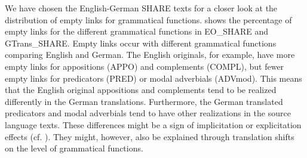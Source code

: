 \documentclass[output=paper]{LSP/langsci}
\begin{document}
We have chosen the English-German SHARE texts for a closer look at the distribution of empty links for grammatical functions.  shows the percentage of empty links for the different grammatical functions in EO\_SHARE and GTrans\_SHARE. Empty links occur with different grammatical functions comparing English and German. The English originals, for example, have more empty links for appositions (APPO) and complements (COMPL), but fewer empty links for predicators (PRED) or modal adverbials (ADVmod). This means that the English original appositions and complements tend to be realized differently in the German translations. Furthermore, the German translated predicators and modal adverbials tend to have other realizations in the source language texts. These differences might be a sign of implicitation or explicitation effects (cf. 
\citealt{Hansen-SchirraEtAl2007}). They might, however, also be explained through translation shifts on the level of grammatical functions.
\end{document}
